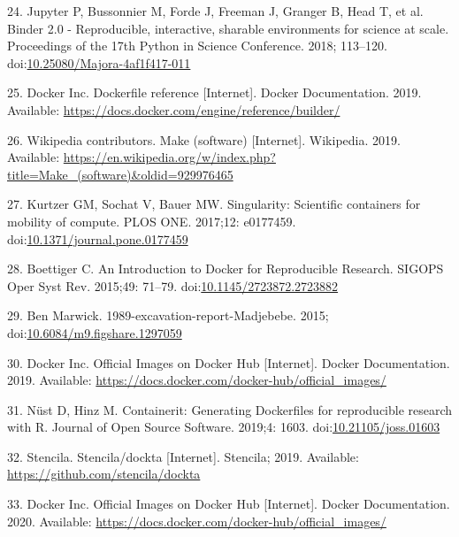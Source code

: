 \documentclass[10pt,letterpaper]{article}
\begin{document}
\leavevmode\hypertarget{ref-jupyter_binder_2018}{}%
24. Jupyter P, Bussonnier M, Forde J, Freeman J, Granger B, Head T, et
al. Binder 2.0 - Reproducible, interactive, sharable environments for
science at scale. Proceedings of the 17th Python in Science Conference.
2018; 113--120.
doi:\href{https://doi.org/10.25080/Majora-4af1f417-011}{10.25080/Majora-4af1f417-011}

\leavevmode\hypertarget{ref-docker_inc_dockerfile_2019}{}%
25. Docker Inc. Dockerfile reference {[}Internet{]}. Docker
Documentation. 2019. Available:
\url{https://docs.docker.com/engine/reference/builder/}

\leavevmode\hypertarget{ref-wikipedia_contributors_make_2019}{}%
26. Wikipedia contributors. Make (software) {[}Internet{]}. Wikipedia.
2019. Available:
\url{https://en.wikipedia.org/w/index.php?title=Make_(software)\&oldid=929976465}

\leavevmode\hypertarget{ref-kurtzer_singularity_2017}{}%
27. Kurtzer GM, Sochat V, Bauer MW. Singularity: Scientific containers
for mobility of compute. PLOS ONE. 2017;12: e0177459.
doi:\href{https://doi.org/10.1371/journal.pone.0177459}{10.1371/journal.pone.0177459}

\leavevmode\hypertarget{ref-boettiger_introduction_2015}{}%
28. Boettiger C. An Introduction to Docker for Reproducible Research.
SIGOPS Oper Syst Rev. 2015;49: 71--79.
doi:\href{https://doi.org/10.1145/2723872.2723882}{10.1145/2723872.2723882}

\leavevmode\hypertarget{ref-marwick_madjebebe_2015}{}%
29. Ben Marwick. 1989-excavation-report-Madjebebe. 2015;
doi:\href{https://doi.org/10.6084/m9.figshare.1297059}{10.6084/m9.figshare.1297059}

\leavevmode\hypertarget{ref-docker_inc_official_2019}{}%
30. Docker Inc. Official Images on Docker Hub {[}Internet{]}. Docker
Documentation. 2019. Available:
\url{https://docs.docker.com/docker-hub/official_images/}

\leavevmode\hypertarget{ref-nust_containerit_2019}{}%
31. Nüst D, Hinz M. Containerit: Generating Dockerfiles for reproducible
research with R. Journal of Open Source Software. 2019;4: 1603.
doi:\href{https://doi.org/10.21105/joss.01603}{10.21105/joss.01603}

\leavevmode\hypertarget{ref-stencila_dockta_2019}{}%
32. Stencila. Stencila/dockta {[}Internet{]}. Stencila; 2019. Available:
\url{https://github.com/stencila/dockta}

\leavevmode\hypertarget{ref-docker_inc_official_2020}{}%
33. Docker Inc. Official Images on Docker Hub {[}Internet{]}. Docker
Documentation. 2020. Available:
\url{https://docs.docker.com/docker-hub/official_images/}
\end{document}
